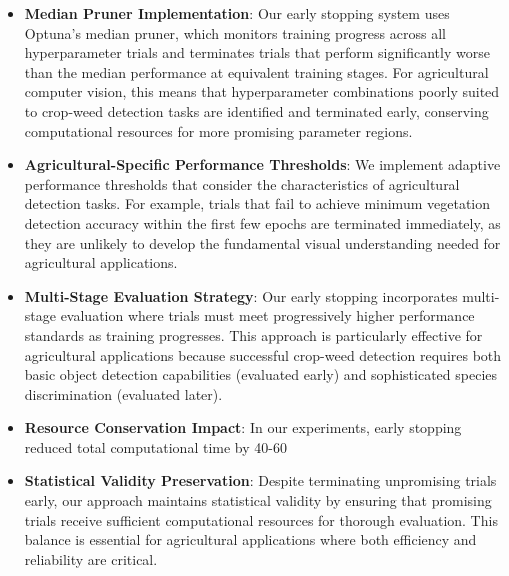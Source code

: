 \begin{itemize}
    \item \textbf{Median Pruner Implementation}: Our early stopping system uses Optuna's median pruner, which monitors training progress across all hyperparameter trials and terminates trials that perform significantly worse than the median performance at equivalent training stages. For agricultural computer vision, this means that hyperparameter combinations poorly suited to crop-weed detection tasks are identified and terminated early, conserving computational resources for more promising parameter regions.
    
    \item \textbf{Agricultural-Specific Performance Thresholds}: We implement adaptive performance thresholds that consider the characteristics of agricultural detection tasks. For example, trials that fail to achieve minimum vegetation detection accuracy within the first few epochs are terminated immediately, as they are unlikely to develop the fundamental visual understanding needed for agricultural applications.
    
    \item \textbf{Multi-Stage Evaluation Strategy}: Our early stopping incorporates multi-stage evaluation where trials must meet progressively higher performance standards as training progresses. This approach is particularly effective for agricultural applications because successful crop-weed detection requires both basic object detection capabilities (evaluated early) and sophisticated species discrimination (evaluated later).
    
    \item \textbf{Resource Conservation Impact}: In our experiments, early stopping reduced total computational time by 40-60%
    
    \item \textbf{Statistical Validity Preservation}: Despite terminating unpromising trials early, our approach maintains statistical validity by ensuring that promising trials receive sufficient computational resources for thorough evaluation. This balance is essential for agricultural applications where both efficiency and reliability are critical.
\end{itemize}

